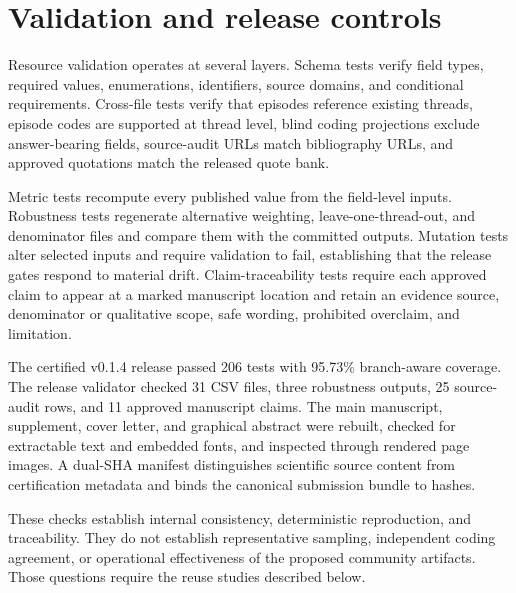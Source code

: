 \section{Validation and release controls}

Resource validation operates at several layers. Schema tests verify field types, required values, enumerations, identifiers, source domains, and conditional requirements. Cross-file tests verify that episodes reference existing threads, episode codes are supported at thread level, blind coding projections exclude answer-bearing fields, source-audit URLs match bibliography URLs, and approved quotations match the released quote bank.

Metric tests recompute every published value from the field-level inputs. Robustness tests regenerate alternative weighting, leave-one-thread-out, and denominator files and compare them with the committed outputs. Mutation tests alter selected inputs and require validation to fail, establishing that the release gates respond to material drift. Claim-traceability tests require each approved claim to appear at a marked manuscript location and retain an evidence source, denominator or qualitative scope, safe wording, prohibited overclaim, and limitation.

The certified v0.1.4 release passed 206 tests with 95.73\% branch-aware coverage. The release validator checked 31 CSV files, three robustness outputs, 25 source-audit rows, and 11 approved manuscript claims. The main manuscript, supplement, cover letter, and graphical abstract were rebuilt, checked for extractable text and embedded fonts, and inspected through rendered page images. A dual-SHA manifest distinguishes scientific source content from certification metadata and binds the canonical submission bundle to hashes.

These checks establish internal consistency, deterministic reproduction, and traceability. They do not establish representative sampling, independent coding agreement, or operational effectiveness of the proposed community artifacts. Those questions require the reuse studies described below.
